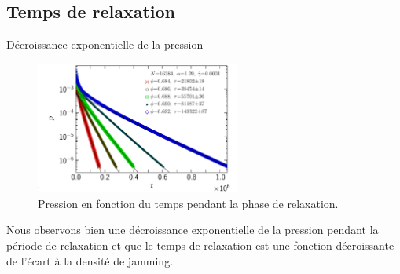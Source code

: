 \documentclass{beamer}
\begin{document}
\subsection{Temps de relaxation}

\begin{frame}{Décroissance exponentielle de la pression}

\begin{figure}[h!]
\includegraphics[width=0.6\textwidth]{pe_t_16384_EL120_GDh100}
\caption{Pression en fonction du temps pendant la phase de relaxation.}
\end{figure}
Nous observons bien une décroissance exponentielle de la pression pendant la période de relaxation et que le temps de relaxation est une fonction décroissante de l’écart à la densité de jamming.

\end{frame}
\end{document}
